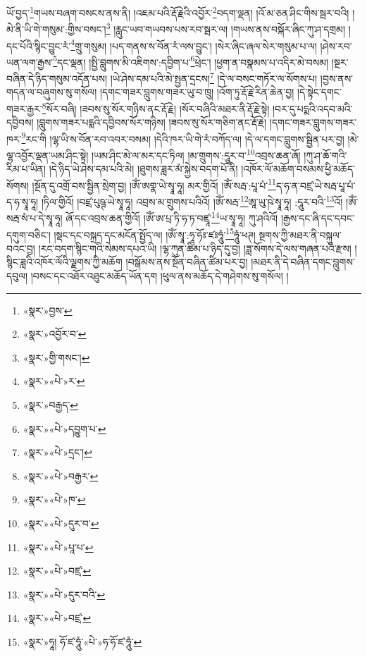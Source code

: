 ཡོ་བྱད་\footnote{«སྣར་»བྱས་}གཡས་བཞག་བསངས་ནས་ནི། །འཇམ་པའི་རྡོ་རྗེའི་འབྱོར་\footnote{«སྣར་»འབྱོར་བ་}བདག་ལྡན། །འོ་མ་ཅན་ཤིང་གིས་སྦར་བའི། །མེ་ནི་ཡི་གེ་གསུམ་:གྱིས་བསང་།\footnote{«སྣར་»གྱི་གསང་།} །རླུང་ཡབ་གཡབས་པས་རབ་སྦར་ལ། །གཡས་ནས་བསྐོར་ཞིང་ཀུ་ཤ་དགྲམ། །དང་པོའི་སྙིང་བྱུང་རཾ་\footnote{«སྣར་»«པེ་»ར་}གྲུ་གསུམ། །པད་གནས་ས་བོན་རཾ་ལས་བྱུང་། །སེར་ཞིང་ཞལ་སེར་གསུམ་པ་ལ། །ཤེས་རབ་ཡན་ལག་རྒྱས་\footnote{«སྣར་»བརྒྱད་}དང་ལྡན། །སྤྱི་བླུགས་མི་འཇིགས་:དབྱིག་པ་\footnote{«སྣར་»«པེ་»དབྱུག་པ་}ཕྲེང་། །ཕྱག་ན་བསྣམས་པ་འདིར་མེ་བསམ། །སྔར་བཞིན་དེ་ཉིད་གསུམ་འདོན་པས། །ཡེ་ཤེས་དམ་པའི་མེ་སྤྱན་དྲངས།\footnote{«སྣར་»«པེ་»དྲང་།} །དེ་ལ་བསང་གཏོར་ལ་སོགས་པ། །བྱས་ནས་གདན་ལ་བཞུགས་སུ་གསོལ། །དགང་གཟར་བླུགས་གཟར་ཡུ་བ་ཁྲུ། །འོག་ཏུ་རྡོ་རྗེ་རིན་ཆེན་བྱ། །དེ་སྟེང་དགང་གཟར་རྒྱར་\footnote{«སྣར་»«པེ་»བརྒྱར་}སོར་བཞི། །ཟབས་སུ་སོར་གཉིས་ནང་རྡོ་རྗེ། །སོར་བཞིའི་མཐར་ནི་རྡོ་རྗེ་སྟེ། །བར་དུ་པདྨའི་འདབ་མའི་དབྱིབས། །བླུགས་གཟར་པདྨའི་དབྱིབས་སོར་གཉིས། །ཟབས་སུ་སོར་གཅིག་ནང་རྡོ་རྗེ། །དགང་གཟར་བླུགས་གཟར་ཁར་\footnote{«སྣར་»«པེ་»ཁ་}རང་གི །ལྷ་ཡི་ས་བོན་རབ་འབར་བསམ། །དེའི་ཁར་ཡི་གེ་རཾ་བཀོད་ལ། །དེ་ལ་དགང་བླུགས་སྦྱིན་པར་བྱ། །མེ་ལྷ་འབྱོར་ལྡན་ཡམ་ཤིང་སྟེ། །ཡམ་ཤིང་མེ་ལ་མར་དང་ཏིལ། །མ་གྲུགས་:དཱུར་བ་\footnote{«སྣར་»«པེ་»དུར་བ་}འབྲས་ཆན་ཞོ། །ཀུ་ཤ་ཆོ་གའི་རིམ་པ་ཡིན། །དེ་ཉིད་ཡེ་ཤེས་དམ་པའི་མེ། །ཐུགས་ཟླར་མཾ་སྐྱེས་བདག་པོ་ནི། །འཁོར་ལོ་མཆོག་བསམས་ཕྱི་མཆོད་སོགས། །སྔོན་དུ་འགྲོ་བས་སྦྱིན་སྲེག་བྱ། །ཨོཾ་ཨགྣ་ཡེ་སྭཱ་ཧཱ། མར་གྱིའོ། །ཨོཾ་སརྦ་:པཱ་པཾ་\footnote{«སྣར་»«པེ་»པཱ་པ་}ད་ཧ་ན་བཛྲ་ཡེ་སརྦ་པཱ་པཾ་ད་ཧ་སྭཱ་ཧཱ། །ཏིལ་གྱིའོ། །བཛྲ་པུཥྚ་ཡེ་སྭཱ་ཧཱ། འབྲས་མ་གྲུགས་པའིའོ། །ཨོཾ་སརྦ་\footnote{«སྣར་»«པེ་»བཛྲ་}ཨཱ་ཡུ་ཥེ་སྭཱ་ཧཱ། :དཱུར་བའི་\footnote{«སྣར་»«པེ་»དུར་བའི་}འོ། །ཨོཾ་སརྦ་སཾ་པ་དེ་སྭཱ་ཧཱ། ཞོ་དང་འབྲས་ཆན་གྱིའོ། །ཨོཾ་ཨ་པྲ་ཏི་ཧ་ཏ་བཛྲཱ་\footnote{«སྣར་»«པེ་»བཛྲ་}ཡ་སྭཱ་ཧཱ། ཀུ་ཤའིའོ། །རྒྱས་དང་ཞི་དང་དབང་དགུག་བཅིང་། །སྡང་དང་བསྐྲད་དང་མངོན་སྤྱོད་ལ། །ཨོཾ་སྭཱ་:ཧཱ་ཧོཿ་ཛཿཧཱུཾ་\footnote{«སྣར་»ཧཱ། ཧོ་ཛ་ཧཱུཾ་«པེ་»ཧ་ཧོ་ཛ་ཧཱུཾ་}ཧཱུཾ་ཕཊ། སྔགས་ཀྱི་མཐར་ནི་བསྐུལ་བའང་བྱ། །རང་བདག་སྙིང་གའི་སེམས་དཔའ་ཡི། །ལྷ་ཀུན་ཚིམ་པ་ཉིད་དུ་བྱ། །ཟླ་སོགས་དེ་ལས་གཞན་པའི་རྫས། །སྙིང་ཟླའི་འཁོར་ལོའི་ལྗགས་ཀྱི་མཆོག །བསྒོམས་ནས་སྔོན་བཞིན་ཚིམ་པར་བྱ། །མཐར་ནི་དེ་བཞིན་དགང་བླུགས་དབུལ། །བསང་དང་འཐོར་འཐུང་མཆོད་ཡོན་དག །ཕུལ་ནས་མཆོད་དེ་གཤེགས་སུ་གསོལ། །
